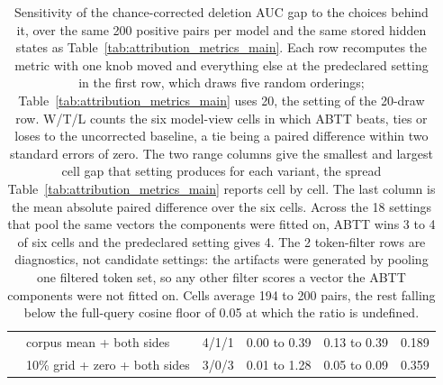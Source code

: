 \begin{table}[t]
\begin{tabular}{llcccc}
 & corpus mean + both sides & 4/1/1 & 0.00 to 0.39 & 0.13 to 0.39 & 0.189 \\
 & 10\% grid + zero + both sides & 3/0/3 & 0.01 to 1.28 & 0.05 to 0.09 & 0.359 \\
\bottomrule
\end{tabular}
\caption{Sensitivity of the chance-corrected deletion AUC gap to the choices behind it, over the same 200 positive pairs per model and the same stored hidden states as Table~\ref{tab:attribution_metrics_main}. Each row recomputes the metric with one knob moved and everything else at the predeclared setting in the first row, which draws five random orderings; Table~\ref{tab:attribution_metrics_main} uses 20, the setting of the 20-draw row. W/T/L counts the six model-view cells in which ABTT beats, ties or loses to the uncorrected baseline, a tie being a paired difference within two standard errors of zero. The two range columns give the smallest and largest cell gap that setting produces for each variant, the spread Table~\ref{tab:attribution_metrics_main} reports cell by cell. The last column is the mean absolute paired difference over the six cells. Across the 18 settings that pool the same vectors the components were fitted on, ABTT wins 3 to 4 of six cells and the predeclared setting gives 4. The 2 token-filter rows are diagnostics, not candidate settings: the artifacts were generated by pooling one filtered token set, so any other filter scores a vector the ABTT components were not fitted on. Cells average 194 to 200 pairs, the rest falling below the full-query cosine floor of 0.05 at which the ratio is undefined.}
\label{tab:attribution_delauc_sensitivity}
\end{table}
